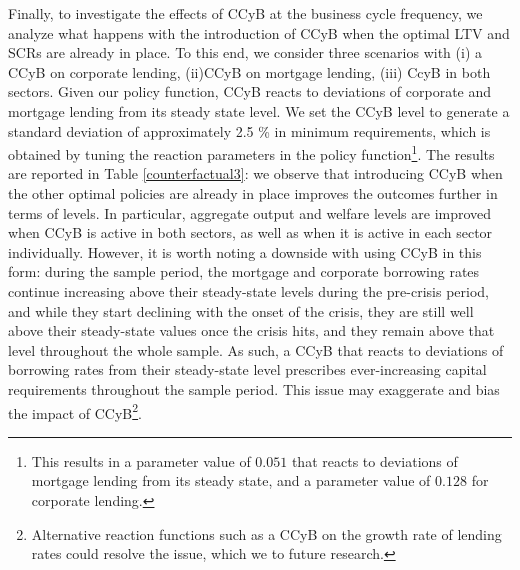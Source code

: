 \documentclass[12pt]{article}
\numberwithin{equation}{section}
\begin{document}




Finally, to investigate the effects of  CCyB at the business cycle frequency,  we analyze what happens with the introduction of CCyB when the optimal LTV and SCRs are already in place. To this end, we consider three scenarios with (i) a CCyB on corporate lending, (ii)CCyB on mortgage lending, (iii) CcyB in both sectors. Given our policy function, CCyB reacts to deviations of corporate and mortgage lending from its steady state level. We set the CCyB level to generate a standard deviation of approximately 2.5 \% in minimum requirements, which is obtained by tuning the reaction parameters in the policy function\footnote{This results in a parameter value of $0.051$ that reacts to deviations of mortgage lending from its steady state, and a parameter value of $0.128$ for corporate lending.}. The results are reported in Table \ref{counterfactual3}: we observe that introducing CCyB when the other optimal policies are already in place improves the outcomes further in terms of levels. In particular, aggregate output and welfare levels are improved when CCyB is active in both sectors, as well as when it is active in each sector individually. However, it is worth noting a downside with using CCyB in this form: during the sample period, the mortgage and corporate borrowing rates continue increasing above their steady-state levels during the pre-crisis period, and while they start declining with the onset of the crisis, they are still well above their steady-state values once the crisis hits, and they remain above that level throughout the whole sample. As such, a CCyB that reacts  to deviations of borrowing rates from their steady-state level prescribes ever-increasing capital requirements throughout the sample period. This issue may exaggerate and bias the impact of CCyB\footnote{Alternative reaction functions such as a CCyB on the growth rate of lending rates could resolve the issue, which we to future research.}.
\end{document}
